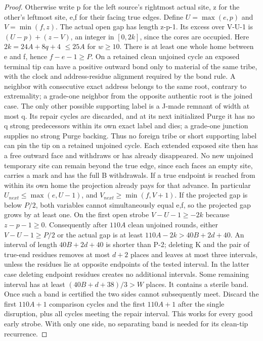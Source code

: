 \begin{proof}
Otherwise write p for the left source's rightmost actual site, z for the other's leftmost site, e,f for their facing true edges. Define \(U=\max (e,p)\) and \(V=\min (f,z)\). The actual open gap has length z-p-1. Its excess over V-U-1 is \((U-p)+(z-V)\), an integer in \([0,2k]\), since the cores are occupied. Here \(2k=24A+8q+4\) \(\le\)\(25A\) for \(w\ge 10\). There is at least one whole home between e and f, hence \(f-e-1\ge P\). On a retained clean unjoined cycle an exposed terminal tip can have a positive outward bond only to material of the same tribe, with the clock and address-residue alignment required by the bond rule. A neighbor with consecutive exact address belongs to the same root, contrary to extremality; a grade-one neighbor from the opposite authentic root is the joined case. The only other possible supporting label is a J-made remnant of width at most q. Its repair cycles are discarded, and at its next initialized Purge it has no q strong predecessors within its own exact label and dies; a grade-one junction supplies no strong Purge backing. Thus no foreign tribe or short supporting label can pin the tip on a retained unjoined cycle. Each extended exposed site then has a free outward face and withdraws or has already disappeared. No new unjoined temporary site can remain beyond the true edge, since each faces an empty site, carries a mark and has the full B withdrawals. If a true endpoint is reached from within its own home the projection already pays for that advance. In particular
\(U_{next}\le \max (e,U-1)\), and \(V_{next}\ge \min (f,V+1)\).
If the projected gap is below \(P/2\), both variables cannot simultaneously equal e,f, so the projected gap grows by at least one. On the first open strobe \(V-U-1\ge -2k\) because \(z-p-1\ge 0\). Consequently after \(110A\) clean unjoined rounds, either \(V-U-1\ge P/2\) or the actual gap is at least \(110A-2k>40B+2d+40\). An interval of length \(40B+2d+40\) is shorter than P-2; deleting K and the pair of true-end residues removes at most \(d+2\) places and leaves at most three intervals, unless the residues lie at opposite endpoints of the tested interval. In the latter case deleting endpoint residues creates no additional intervals. Some remaining interval has at least \((40B+d+38)/3>W\) places. It contains a sterile band. Once such a band is certified the two sides cannot subsequently meet. Discard the first \(110A+1\) comparison cycles and the first \(110A+1\) after the single disruption, plus all cycles meeting the repair interval. This works for every good early strobe. With only one side, no separating band is needed for its clean-tip recurrence.


\end{proof}

